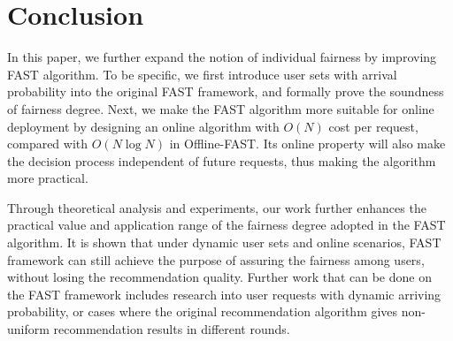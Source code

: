 \section{Conclusion}

In this paper, we further expand the notion of individual fairness by improving FAST algorithm. To be specific, we first introduce user sets with arrival probability into the original FAST framework, and formally prove the soundness of fairness degree. Next, we make the FAST algorithm more suitable for online deployment by designing an online algorithm with $O(N)$ cost per request, compared with $O(N \log N)$ in Offline-FAST. Its online property will also make the decision process independent of future requests, thus making the algorithm more practical.

Through theoretical analysis and experiments, our work further enhances the practical value and application range of the fairness degree adopted in the FAST algorithm. It is shown that under dynamic user sets and online scenarios, FAST framework can still achieve the purpose of assuring the fairness among users, without losing the recommendation quality. Further work that can be done on the FAST framework includes research into user requests with dynamic arriving probability, or cases where the original recommendation algorithm gives non-uniform recommendation results in different rounds.
